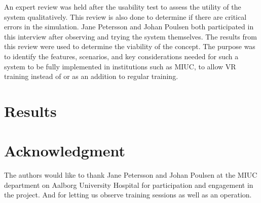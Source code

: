 \documentclass[conference]{IEEEtran}
\begin{document}
An expert review was held after the usability test to assess the utility of the system qualitatively. This review is also done to determine if there are critical errors in the simulation. Jane Petersson and Johan Poulsen both participated in this interview after observing and trying the system themselves. The results from this review were used to determine the viability of the concept. The purpose was to identify the features, scenarios, and key considerations needed for such a system to be fully implemented in institutions such as MIUC, to allow VR training instead of or as an addition to regular training.


\section{Results}
%
%



%
%






\section*{Acknowledgment}
The authors would like to thank Jane Petersson and Johan Poulsen at the MIUC department on Aalborg University Hospital for participation and engagement in the project. And for letting us observe training sessions as well as an operation.

\end{document}
